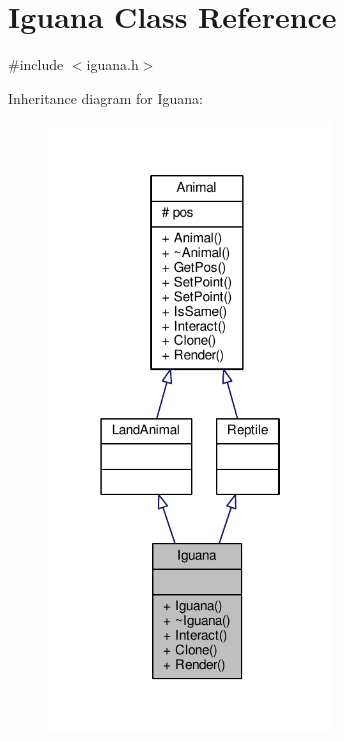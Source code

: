 \hypertarget{classIguana}{}\section{Iguana Class Reference}
\label{classIguana}


{\ttfamily \#include $<$iguana.\+h$>$}



Inheritance diagram for Iguana\+:
\nopagebreak
\begin{figure}[H]
\begin{center}
\leavevmode
\includegraphics[width=214pt]{classIguana__inherit__graph}
\end{center}
\end{figure}


